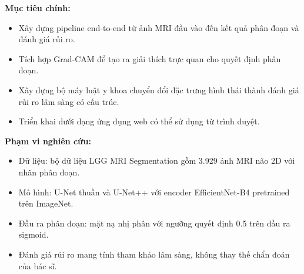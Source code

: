 \textbf{Mục tiêu chính:}
\begin{itemize}
    \item Xây dựng pipeline end-to-end từ ảnh MRI đầu vào đến kết quả phân đoạn và đánh giá rủi ro.
    \item Tích hợp Grad-CAM để tạo ra giải thích trực quan cho quyết định phân đoạn.
    \item Xây dựng bộ máy luật y khoa chuyển đổi đặc trưng hình thái thành đánh giá rủi ro lâm sàng có cấu trúc.
    \item Triển khai dưới dạng ứng dụng web có thể sử dụng từ trình duyệt.
\end{itemize}

\textbf{Phạm vi nghiên cứu:}
\begin{itemize}
    \item Dữ liệu: bộ dữ liệu LGG MRI Segmentation \cite{Buda2019} gồm 3.929 ảnh MRI não 2D với nhãn phân đoạn.
    \item Mô hình: U-Net thuần và U-Net++ với encoder EfficientNet-B4 pretrained trên ImageNet.
    \item Đầu ra phân đoạn: mặt nạ nhị phân với ngưỡng quyết định 0.5 trên đầu ra sigmoid.
    \item Đánh giá rủi ro mang tính tham khảo lâm sàng, không thay thế chẩn đoán của bác sĩ.
\end{itemize}

